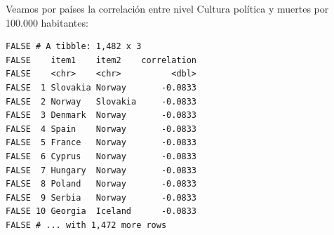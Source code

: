 \documentclass[
]{article}
\newenvironment{Shaded}{\begin{snugshade}}{\end{snugshade}}
\newcommand{\DataTypeTok}[1]{\textcolor[rgb]{0.13,0.29,0.53}{#1}}
\newcommand{\DecValTok}[1]{\textcolor[rgb]{0.00,0.00,0.81}{#1}}
\newcommand{\KeywordTok}[1]{\textcolor[rgb]{0.13,0.29,0.53}{\textbf{#1}}}
\newcommand{\NormalTok}[1]{#1}
\newcommand{\OperatorTok}[1]{\textcolor[rgb]{0.81,0.36,0.00}{\textbf{#1}}}
\newcommand{\StringTok}[1]{\textcolor[rgb]{0.31,0.60,0.02}{#1}}
\begin{document}
Veamos por países la correlación entre nivel Cultura política y muertes
por 100.000 habitantes:

\begin{Shaded}
\end{Shaded}

\begin{verbatim}
FALSE # A tibble: 1,482 x 3
FALSE    item1    item2    correlation
FALSE    <chr>    <chr>          <dbl>
FALSE  1 Slovakia Norway       -0.0833
FALSE  2 Norway   Slovakia     -0.0833
FALSE  3 Denmark  Norway       -0.0833
FALSE  4 Spain    Norway       -0.0833
FALSE  5 France   Norway       -0.0833
FALSE  6 Cyprus   Norway       -0.0833
FALSE  7 Hungary  Norway       -0.0833
FALSE  8 Poland   Norway       -0.0833
FALSE  9 Serbia   Norway       -0.0833
FALSE 10 Georgia  Iceland      -0.0833
FALSE # ... with 1,472 more rows
\end{verbatim}

\begin{Shaded}
\end{Shaded}
\end{document}
